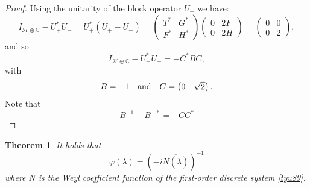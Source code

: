 \documentclass[12pt]{amsart}
\newtheorem{thm}{Theorem}[section]
\theoremstyle{definition}
\theoremstyle{remark}
\numberwithin{equation}{section}
\begin{document}
  \begin{proof}
Using the unitarity of the block operator $U_+$ we have:
\begin{equation}
  I_{\mathcal H\oplus\mathbb C}-U_+^*U_-=U_+^*(U_+-U_-)=\begin{pmatrix}T^*&G^*\\F^*&H^*\end{pmatrix}\begin{pmatrix}0&2F\\0&2H\end{pmatrix}
  =\begin{pmatrix}0&0\\0&2\end{pmatrix},
\end{equation}
and so
\[
I_{\mathcal H\oplus\mathbb C}-U_+^*U_-=-C^*BC,
\]
with
\begin{equation}
  B=-1\quad{\rm and}\quad C=\begin{pmatrix}0&\sqrt{2}\end{pmatrix}.
\end{equation}
Note that
\[
B^{-1}+B^{-*}=-CC^*
\]
\end{proof}
\begin{thm}
  It holds that
  \begin{equation}
    \varphi({\lambda})=\left(-i\overline{N(\overline{{\lambda}})}\right)^{-1}
  \end{equation}
  where $N$ is the Weyl coefficient function of the first-order discrete system \eqref{tyu89}.
  \end{thm}
\end{document}
